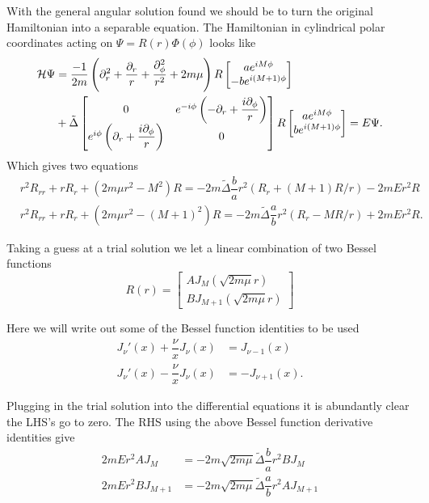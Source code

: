 With the general angular solution found we should be to turn the original Hamiltonian into a separable equation. 
The Hamiltonian in cylindrical polar coordinates acting on $\Psi = R(r)\Phi(\phi)$ looks like
\begin{align*}
  \mathcal{H}\Psi &= \dfrac{-1}{2m}\left(\partial_r^2 + \dfrac{\partial_r}{r} + \dfrac{\partial_{\phi}^2}{r^2} + 2m\mu\right) R
  \begin{bmatrix}
    ae^{iM\phi} \\
    -be^{i(M+1)\phi}
  \end{bmatrix} \\
  &+\tilde{\Delta}
  \begin{bmatrix}
    0 & e^{-i\phi}\left(-\partial_r + \dfrac{i\partial_{\phi}}{r}\right) \\
    e^{i\phi}\left(\partial_r + \dfrac{i\partial_{\phi}}{r}\right) & 0
  \end{bmatrix} R
  \begin{bmatrix}
    ae^{iM\phi} \\
    be^{i(M+1)\phi}
  \end{bmatrix}  = E\Psi.
\end{align*}
Which gives two equations
\begin{align}
  &r^2R_{rr} + rR_r + (2m\mu r^2-M^2)R = -2m\tilde{\Delta}\dfrac{b}{a}r^2(R_r + (M+1)R/r) - 2mEr^2R \\
  &r^2R_{rr} + rR_r + (2m\mu r^2-(M+1)^2)R = -2m\tilde{\Delta}\dfrac{a}{b}r^2(R_r - MR/r) + 2mEr^2R.
\end{align}

Taking a guess at a trial solution we let a linear combination of two Bessel functions
\begin{equation}
  R(r) = 
  \begin{bmatrix}
    AJ_M(\sqrt{2m\mu}r) \\
    BJ_{M+1}(\sqrt{2m\mu}r)
  \end{bmatrix}
\end{equation}

Here we will write out some of the Bessel function identities to be used
\begin{align*}
  J_{\nu}'(x) + \dfrac{\nu}{x}J_{\nu}(x) &= J_{\nu-1}(x) \\
  J_{\nu}'(x) - \dfrac{\nu}{x}J_{\nu}(x) &= - J_{\nu+1}(x).
\end{align*}

Plugging in the trial solution into the differential equations it is abundantly clear the LHS's go to zero. The RHS using the above Bessel function derivative identities give
\begin{align}
  2mEr^2AJ_M &= -2m\sqrt{2m\mu}\tilde\Delta\dfrac{b}{a}r^2BJ_M \\
  2mEr^2BJ_{M+1} &= -2m\sqrt{2m\mu}\tilde\Delta\dfrac{a}{b}r^2AJ_{M+1}
\end{align}

